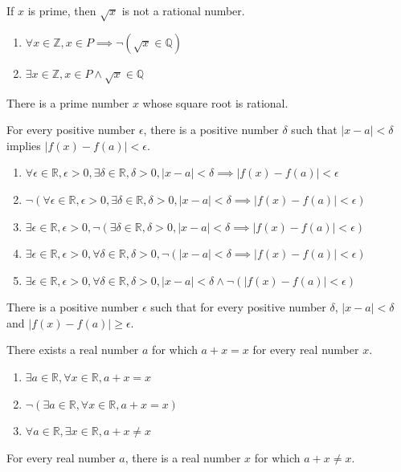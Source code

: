 \documentclass[DIN, pagenumber=false, fontsize=11pt, parskip=half]{scrartcl}
\begin{document}
\begin{problems}
    \problem If $x$ is prime, then $\sqrt{x}$ is not a rational number.
    \answer
    \begin{enumerate}
        \item $\forall x \in \mathbb{Z}, x \in P \implies \lnot(\sqrt{x} \in \mathbb{Q})$
        \item $\exists x \in \mathbb{Z}, x \in P \land \sqrt{x} \in \mathbb{Q}$
    \end{enumerate}
    There is a prime number $x$ whose square root is rational.

    \problem For every positive number $\epsilon$, there is a positive number $\delta$ such that $|x - a| < \delta$ implies $|f(x) - f(a)| < \epsilon$.
    \answer 
    \begin{enumerate}
        \item $\forall \epsilon \in \mathbb{R}, \epsilon > 0, \exists \delta \in \mathbb{R}, \delta > 0, |x - a| < \delta \implies |f(x) - f(a)| < \epsilon$ 
        \item $\lnot(\forall \epsilon \in \mathbb{R}, \epsilon > 0, \exists \delta \in \mathbb{R}, \delta > 0, |x - a| < \delta \implies |f(x) - f(a)| < \epsilon)$ 
        \item $\exists \epsilon \in \mathbb{R}, \epsilon > 0, \lnot(\exists \delta \in \mathbb{R}, \delta > 0, |x - a| < \delta \implies |f(x) - f(a)| < \epsilon)$
        \item $\exists \epsilon \in \mathbb{R}, \epsilon > 0, \forall \delta \in \mathbb{R}, \delta > 0, \lnot(|x - a| < \delta \implies |f(x) - f(a)| < \epsilon)$
        \item $\exists \epsilon \in \mathbb{R}, \epsilon > 0, \forall \delta \in \mathbb{R}, \delta > 0, |x - a| < \delta \land \lnot(|f(x) - f(a)| < \epsilon)$
    \end{enumerate}
    There is a positive number $\epsilon$ such that for every positive number $\delta$, $|x - a| < \delta$ and $|f(x) - f(a)| \geq \epsilon$.


    \problem There exists a real number $a$ for which $a + x = x$ for every real number $x$.
    \answer
    \begin{enumerate}
        \item $\exists a \in \mathbb{R}, \forall x \in \mathbb{R}, a + x = x$ 
        \item $\lnot(\exists a \in \mathbb{R}, \forall x \in \mathbb{R}, a + x = x)$
        \item $\forall a \in \mathbb{R}, \exists x \in \mathbb{R}, a + x \neq x$
    \end{enumerate}
    For every real number $a$, there is a real number $x$ for which $a + x \neq x$.


\end{problems}
\end{document}
